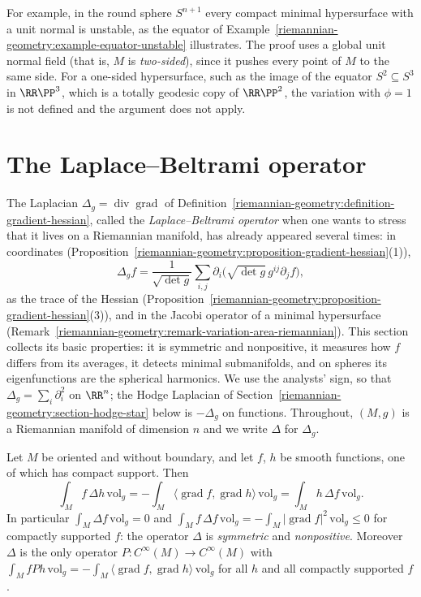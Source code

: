 For example, in the round sphere $S^{n+1}$ every compact minimal hypersurface with a unit normal is unstable, as the equator of
Example~\ref{riemannian-geometry:example-equator-unstable} illustrates. The proof uses a global unit normal field (that is, $M$ is \emph{two-sided}), since it pushes every point of $M$ to the same side. For a one-sided hypersurface, such as the
image of the equator $S^2 \subseteq S^3$ in $\RR\PP^3$, which is a totally geodesic copy of $\RR\PP^2$, the variation with $\phi = 1$ is not defined and the argument does not apply.

\section{The Laplace--Beltrami operator}\label{riemannian-geometry:section-laplace-beltrami}

The Laplacian $\Delta_g = \operatorname{div}\operatorname{grad}$ of Definition~\ref{riemannian-geometry:definition-gradient-hessian}, called the \emph{Laplace--Beltrami operator} when one wants to
stress that it lives on a Riemannian manifold, has already appeared several times: in coordinates (Proposition~\ref{riemannian-geometry:proposition-gradient-hessian}(1)),
\[
\Delta_gf = \frac{1}{\sqrt{\det g}}\sum_{i,j}\partial_i\bigl(\sqrt{\det g}\,g^{ij}\partial_jf\bigr),
\]
as the trace of the Hessian (Proposition~\ref{riemannian-geometry:proposition-gradient-hessian}(3)), and in the Jacobi operator of a minimal hypersurface
(Remark~\ref{riemannian-geometry:remark-variation-area-riemannian}). This section collects its basic properties: it is symmetric and nonpositive, it measures how $f$ differs from its
averages, it detects minimal submanifolds, and on spheres its eigenfunctions are the spherical harmonics. We use the analysts' sign, so that $\Delta_g = \sum_i\partial_i^2$ on
$\RR^n$; the Hodge Laplacian of Section~\ref{riemannian-geometry:section-hodge-star} below is $-\Delta_g$ on functions. Throughout, $(M, g)$ is a Riemannian manifold of dimension $n$
and we write $\Delta$ for $\Delta_g$.

\begin{proposition}\label{riemannian-geometry:proposition-laplacian-symmetric}
Let $M$ be oriented and without boundary, and let $f$, $h$ be smooth functions, one of which has compact support. Then
\[
\int_Mf\,\Delta h\,\mathrm{vol}_g = -\int_M\langle\operatorname{grad}f, \operatorname{grad}h\rangle\,\mathrm{vol}_g = \int_Mh\,\Delta f\,\mathrm{vol}_g .
\]
In particular $\int_M\Delta f\,\mathrm{vol}_g = 0$ and $\int_Mf\,\Delta f\,\mathrm{vol}_g = -\int_M|\operatorname{grad}f|^2\,\mathrm{vol}_g \leq 0$ for compactly supported $f$: the operator $\Delta$ is
\emph{symmetric} and \emph{nonpositive}. Moreover $\Delta$ is the only operator $P \colon C^\infty(M) \to C^\infty(M)$ with $\int_MfPh\,\mathrm{vol}_g = -\int_M\langle\operatorname{grad}f, \operatorname{grad}h\rangle\,\mathrm{vol}_g$
for all $h$ and all compactly supported $f$.
\end{proposition}

